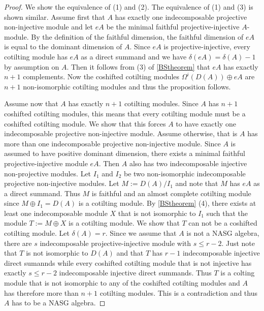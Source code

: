 \documentclass[a4paper]{amsart}
\theoremstyle{definition}
\theoremstyle{remark}
\numberwithin{equation}{theorem}
\begin{document}
\begin{proof}
We show the equivalence of (1) and (2). The equivalence of (1) and (3) is shown similar.
Assume first that $A$ has exactly one indecomposable projective non-injective module and let $eA$ be the minimal faithful projective-injective $A$-module. By the definition of the faithful dimension, the faithful dimension of $eA$ is equal to the dominant dimension of $A$. Since $eA$ is projective-injective, every cotilting module has $eA$ as a direct summand and we have $\delta(eA)=\delta(A)-1$ by assumption on $A$.
Then it follows from (3) of \ref{BStheorem} that $eA$ has exactly $n+1$ complements.  Now the coshifted cotilting modules $\Omega^{i}(D(A)) \oplus eA$ are $n+1$ non-isomorphic cotilting modules and thus the proposition follows.

Assume now that $A$ has exactly $n+1$ cotilting modules. Since $A$ has $n+1$ coshifted cotilting modules, this means that every cotilting module must be a coshifted cotilting module. We show that this forces $A$ to have exactly one indecomposable projective non-injective module. 
Assume otherwise, that is $A$ has more than one indecomposable projective non-injective module. Since $A$ is assumed to have positive dominant dimension, there exists a minimal faithful projective-injective module $eA$. Then $A$ also has two indecomposable injective non-projective modules. Let $I_1$ and $I_2$ be two non-isomorphic indecomposable projective non-injective modules. Let $M:=D(A)/I_1$ and note that $M$ has $eA$ as a direct summand. Thus $M$ is faithful and an almost complete cotilting module since $M \oplus I_1=D(A)$ is a cotilting module.
By \ref{BStheorem} (4), there exists at least one indecomposable module $X$ that is not isomorphic to $I_1$ such that the module $T:=M \oplus X$ is a cotilting module.
We show that $T$ can not be a coshifted cotilting module.
Let $\delta(A)=r$. Since we assume that $A$ is not a NASG algebra, there are $s$ indecomposable projective-injective module with $s \leq r-2$.
Just note that $T$ is not isomorphic to $D(A)$ and that $T$ has $r-1$ indecomposable injective direct sumannds while every coshifted cotilting module that is not injective has exactly $s \leq r-2$ indecomposable injective direct summands. Thus $T$ is a colting module that is not isomorphic to any of the coshifted cotilting modules and $A$ has therefore more than $n+1$ cotilting modules. This is a contradiction and thus $A$ has to be a NASG algebra.




\end{proof}
\end{document}
